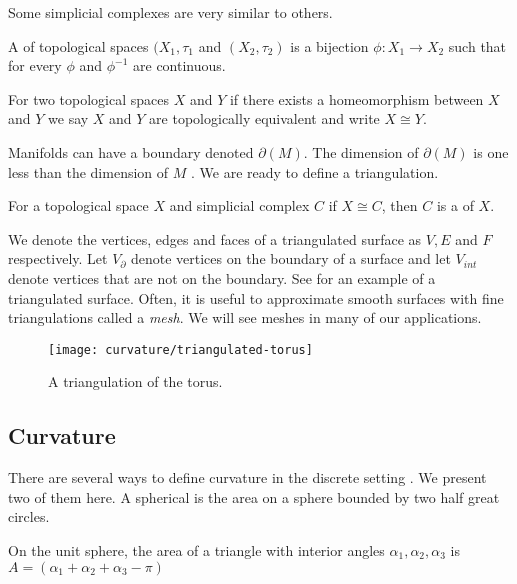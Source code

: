 Some simplicial complexes are very similar to others.


\begin{definition}[Homeomorphism]
A    of topological spaces $(X_1,\tau_1$ and $(X_2,\tau_2)$
is a bijection $\phi:X_1\to X_2$ such that for every $\phi$ and $\phi^{-1}$ are continuous.
\end{definition}
For two topological spaces $X$ and $Y$ if there exists a  homeomorphism between
$X$ and $Y$ we say $X$ and $Y$ are topologically  equivalent and write  $X\cong Y.$

Manifolds can have a boundary denoted $\partial(M)$.
The dimension of $\partial(M)$ is one less than the dimension of $M$ .
We are ready to define a triangulation.

\begin{definition}[Triangulation]
For a topological space $X$ and simplicial complex $C$ if $X\cong C$,
then $C$  is a  of $X$.
\end{definition}

We denote the vertices, edges and faces of a triangulated surface as $V, E$ and $F$ respectively.
Let $V_{\partial}$ denote vertices on the boundary of a surface and let $V_{int}$ 
denote vertices that are not on the boundary.
See  for an example of a triangulated surface.
Often, it is useful to approximate smooth surfaces with fine triangulations called
a \emph{mesh}. We will see meshes in many of our applications.


\begin{figure}[htb]
\centering
\texttt{[image: curvature/triangulated-torus]}
\caption{A triangulation of the torus.}
\label{fig:triangulated-torus}
\end{figure}

\subsection{Curvature}

There are several ways to define curvature in the discrete setting \cite{Crane:2013}.
We present two of them here. 
A spherical  is the area on a sphere bounded by two half great circles.


\begin{lemma}\label{lem:spherical-triangle}
On the unit sphere, the area of a triangle with interior angles $\alpha_1, \alpha_2, \alpha_3$
is $A=(\alpha_1+\alpha_2+\alpha_3-\pi)$
\end{lemma}

